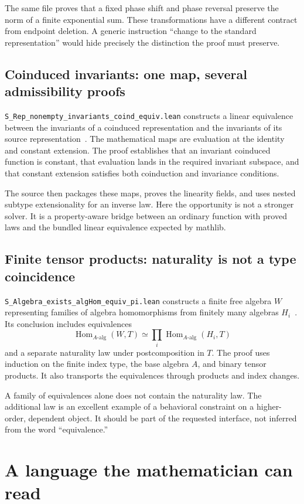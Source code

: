 \documentclass[11pt,letterpaper]{article}
\newcommand{\code}[1]{\nolinkurl{#1}}
\theoremstyle{definition}
\theoremstyle{remark}
\begin{document}
The same file proves that a fixed phase shift and phase reversal preserve the
norm of a finite exponential sum. These transformations have a different
contract from endpoint deletion. A generic instruction ``change to the standard
representation'' would hide precisely the distinction the proof must preserve.

\subsection{Coinduced invariants: one map, several admissibility proofs}
\code{S_Rep_nonempty_invariants_coind_equiv.lean} constructs a linear equivalence
between the invariants of a coinduced representation and the invariants of its
source representation~\cite{FCoind}. The mathematical maps are evaluation at the
identity and constant extension. The proof establishes that an invariant
coinduced function is constant, that evaluation lands in the required invariant
subspace, and that constant extension satisfies both coinduction and invariance
conditions.

The source then packages these maps, proves the linearity fields, and uses nested
subtype extensionality for an inverse law. Here the opportunity is not a stronger
solver. It is a property-aware bridge between an ordinary function with proved
laws and the bundled linear equivalence expected by mathlib.

\subsection{Finite tensor products: naturality is not a type coincidence}
\code{S_Algebra_exists_algHom_equiv_pi.lean} constructs a finite free algebra $W$
representing families of algebra homomorphisms from finitely many algebras
$H_i$~\cite{FTensor}. Its conclusion includes equivalences
\[
\operatorname{Hom}_{A\text{-alg}}(W,T)
\simeq \prod_i\operatorname{Hom}_{A\text{-alg}}(H_i,T)
\]
and a separate naturality law under postcomposition in $T$. The proof uses
induction on the finite index type, the base algebra $A$, and binary tensor
products. It also transports the equivalences through products and index
changes.

A family of equivalences alone does not contain the naturality law. The
additional law is an excellent example of a behavioral constraint on a
higher-order, dependent object. It should be part of the requested interface,
not inferred from the word ``equivalence.''

\section{A language the mathematician can read}\label{sec:surface}
\end{document}
